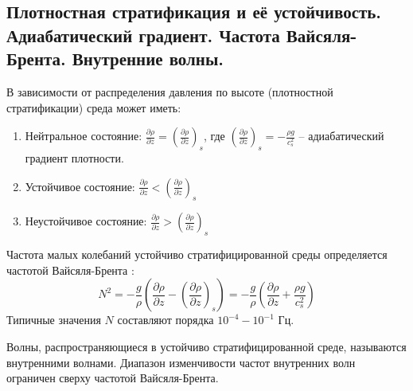 \subsection{Плотностная стратификация и её устойчивость. Адиабатический градиент. Частота Вайсяля-Брента. Внутренние волны.}\label{q3-2}
В зависимости от распределения давления по высоте (плотностной стратификации) среда может иметь:
\begin{enumerate}
\item Нейтральное состояние: $\frac{\partial\rho}{\partial z}=\left(\frac{\partial\rho}{\partial z}\right)_s$, где $\left(\frac{\partial\rho}{\partial z}\right)_s=-\frac{\rho g}{c_s^2}$ -- адиабатический градиент плотности.
\item Устойчивое состояние: $\frac{\partial\rho}{\partial z}<\left(\frac{\partial\rho}{\partial z}\right)_s$
\item Неустойчивое состояние: $\frac{\partial\rho}{\partial z}>\left(\frac{\partial\rho}{\partial z}\right)_s$
\end{enumerate}

Частота малых колебаний устойчиво стратифицированной среды определяется частотой Вайсяля-Брента \cite{Nosov2019-5}:
\begin{equation}\label{eq-3-2-1}
N^2=-\frac{g}{\rho}\left(\frac{\partial\rho}{\partial z}-\left(\frac{\partial\rho}{\partial z}\right)_s\right)=-\frac{g}{\rho}\left(\frac{\partial\rho}{\partial z}+\frac{\rho g}{c_s^2}\right)
\end{equation}
Типичные значения $N$ составляют порядка $10^{-4} - 10^{-1}$ Гц.

Волны, распространяющиеся в устойчиво стратифицированной среде, называются внутренними волнами.
Диапазон изменчивости частот внутренних волн ограничен сверху частотой Вайсяля-Брента.
